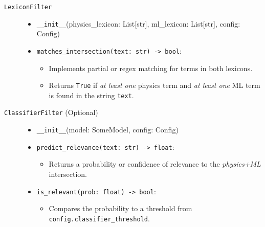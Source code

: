 \documentclass[12pt]{article}
\begin{document}
\begin{description}
  \item[\texttt{LexiconFilter}]
  \begin{itemize}
    \item \texttt{\_\_init\_\_}(physics\_lexicon: List[str], ml\_lexicon: List[str], config: Config)
    \item \texttt{matches\_intersection(text: str) -> bool}: 
    \begin{itemize}
      \item Implements partial or regex matching for terms in both lexicons. 
      \item Returns \texttt{True} if \emph{at least one} physics term and \emph{at least one} ML term is found in the string \texttt{text}.
    \end{itemize}
  \end{itemize}

  \item[\texttt{ClassifierFilter} (Optional)]
  \begin{itemize}
    \item \texttt{\_\_init\_\_}(model: SomeModel, config: Config)
    \item \texttt{predict\_relevance(text: str) -> float}: 
      \begin{itemize}
        \item Returns a probability or confidence of relevance to the \emph{physics+ML} intersection.
      \end{itemize}
    \item \texttt{is\_relevant(prob: float) -> bool}: 
      \begin{itemize}
        \item Compares the probability to a threshold from \texttt{config.classifier\_threshold}.
      \end{itemize}
  \end{itemize}


\end{description}
\end{document}

